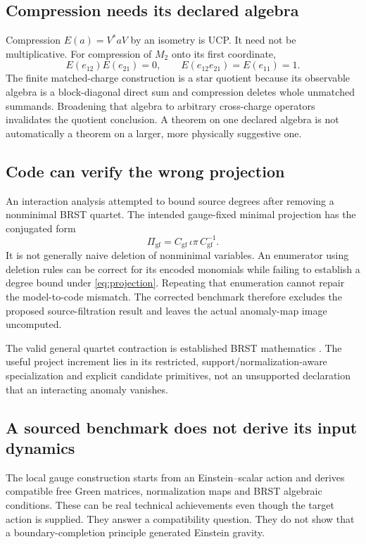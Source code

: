 \documentclass[11pt,a4paper]{article}
\begin{document}
\subsection{Compression needs its declared algebra}
Compression $E(a)=V^*aV$ by an isometry is UCP. It need not be multiplicative.
For compression of $M_2$ onto its first coordinate,
\begin{equation}
E(e_{12})E(e_{21})=0,\qquad E(e_{12}e_{21})=E(e_{11})=1.
\end{equation}
The finite matched-charge construction is a star quotient because its
observable algebra is a block-diagonal direct sum and compression deletes
whole unmatched summands. Broadening that algebra to arbitrary cross-charge
operators invalidates the quotient conclusion. A theorem on one declared
algebra is not automatically a theorem on a larger, more physically suggestive
one.

\subsection{Code can verify the wrong projection}
An interaction analysis attempted to bound source degrees after removing a
nonminimal BRST quartet. The intended gauge-fixed minimal projection has
the conjugated form
\begin{equation}
\Pi_{\mathrm{gf}}=C_{\mathrm{gf}}\,\iota\pi\,C_{\mathrm{gf}}^{-1}.
\label{eq:projection}
\end{equation}
It is not generally naive deletion of nonminimal variables. An enumerator
using deletion rules can be correct for its encoded monomials while failing
to establish a degree bound under \eqref{eq:projection}. Repeating that
enumeration cannot repair the model-to-code mismatch. The corrected benchmark
therefore excludes the proposed source-filtration result and leaves the
actual anomaly-map image uncomputed.

The valid general quartet contraction is established BRST mathematics
\cite{BBH2000}. The useful project increment lies in its restricted,
support/normalization-aware specialization and explicit candidate primitives,
not an unsupported declaration that an interacting anomaly vanishes.

\subsection{A sourced benchmark does not derive its input dynamics}
The local gauge construction starts from an Einstein--scalar action and
derives compatible free Green matrices, normalization maps and BRST algebraic
conditions. These can be real technical achievements even though the target
action is supplied. They answer a compatibility question. They do not show
that a boundary-completion principle generated Einstein gravity.
\end{document}
